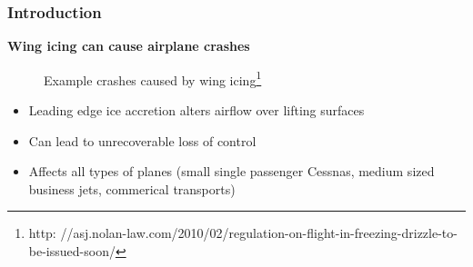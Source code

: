 \documentclass[9pt]{beamer}
\begin{document}
\begin{frame}
\frametitle{Introduction}
\label{sec-1-4}

\textbf{Wing icing can cause airplane crashes}
\begin{figure}
   \caption{Example crashes caused by wing icing\footnote{\tiny http: //asj.nolan-law.com/2010/02/regulation-on-flight-in-freezing-drizzle-to-be-issued-soon/}}
\end{figure}
\begin{itemize}
\item Leading edge ice accretion alters airflow over lifting surfaces
\item Can lead to unrecoverable loss of control
\item Affects all types of planes (small single passenger Cessnas, medium
  sized business jets, commerical transports)
\end{itemize}
\end{frame}
\end{document}
